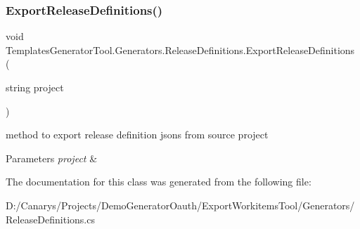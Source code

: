 \subsubsection{\texorpdfstring{Export\+Release\+Definitions()}{ExportReleaseDefinitions()}}
{\footnotesize\ttfamily void Templates\+Generator\+Tool.\+Generators.\+Release\+Definitions.\+Export\+Release\+Definitions (\begin{DoxyParamCaption}\item[{string}]{project }\end{DoxyParamCaption})}



method to export release definition jsons from source project 


\begin{DoxyParams}{Parameters}
{\em project} & \\
\hline
\end{DoxyParams}


The documentation for this class was generated from the following file\+:\begin{DoxyCompactItemize}
\item 
D\+:/\+Canarys/\+Projects/\+Demo\+Generator\+Oauth/\+Export\+Workitems\+Tool/\+Generators/Release\+Definitions.\+cs\end{DoxyCompactItemize}
